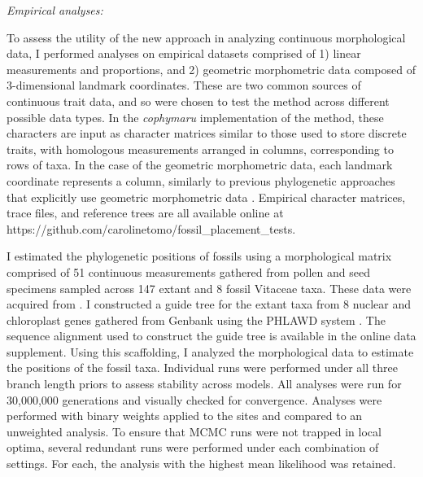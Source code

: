 \documentclass[12pt]{article}
\begin{document}
\noindent\emph{Empirical analyses:}

To assess the utility of the new approach in analyzing continuous 
morphological data, I performed analyses on empirical datasets 
comprised of 1)  linear measurements and proportions, and 2) 
geometric morphometric data composed of 3-dimensional landmark
coordinates. These are two common sources of continuous trait data,
and so were chosen to test the method across different possible data types.
In the \emph{cophymaru} implementation of the method, these characters
are input as character matrices similar to those used to store discrete traits, 
with homologous measurements arranged in columns, corresponding to rows of taxa.
In the case of the geometric morphometric data, each landmark coordinate represents a column, 
similarly to previous phylogenetic approaches that explicitly use geometric morphometric data \citep{catalano2010phylogenetic}.
Empirical character matrices, trace files, and reference trees are all available online at https://github.com/carolinetomo/fossil\_placement\_tests.

I estimated the phylogenetic positions of fossils using a morphological
matrix comprised of 51 continuous measurements gathered from pollen and
seed specimens sampled across 147 extant and 8 fossil Vitaceae taxa.
These data were acquired from \cite{chen2009history}. I constructed a guide tree
for the extant taxa from 8 nuclear and chloroplast genes gathered from
Genbank using the PHLAWD system \citep{soltis2011angiosperm}.
The sequence alignment used to construct the guide tree is available in
the online data supplement.
 Using this scaffolding, I analyzed the morphological data to estimate the positions of the fossil taxa.
Individual runs were performed under all three branch length priors to
assess stability across models. All analyses were run for 30,000,000
generations and visually checked for convergence. Analyses were
performed with binary weights applied to the sites and compared to an
unweighted analysis. To ensure that MCMC runs were not trapped in local
optima, several redundant runs were performed under each combination of settings.
For each, the analysis with the highest mean likelihood was retained.
\end{document}
